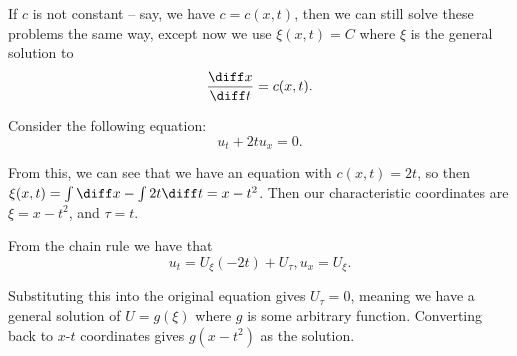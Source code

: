 \newpage 

If $c$ is not constant -- say, we have $c = c(x,t)$, then we can still solve these problems the same way, except now we use $\xi(x,t) = C$ where $\xi$ is the general solution to 
\[ \frac{\diff x}{\diff t} = c(x,t). \] 

\begin{example}{}{}
Consider the following equation: 
\[ u_t + 2tu_x = 0. \] 

From this, we can see that we have an equation with $c(x,t) = 2t$, so then $\xi(x,t) = \int \diff x - \int 2t \diff t = x - t^2$. Then our characteristic coordinates are $\xi = x - t^2$, and $\tau = t$. 

From the chain rule we have that 
\[ u_t = U_\xi(-2t) + U_\tau, u_x = U_\xi. \] 

Substituting this into the original equation gives $U_\tau = 0$, meaning we have a general solution of $U = g(\xi)$ where $g$ is some arbitrary function. Converting back to $x$-$t$ coordinates gives $g(x - t^2)$ as the solution. 

\end{example}
